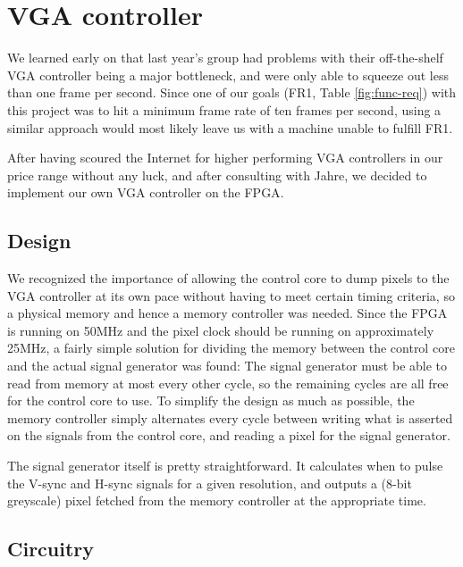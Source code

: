 \section{VGA controller}

We learned early on that last year's group had problems with their off-the-shelf
\ac{VGA} controller being a major bottleneck, and were only able to squeeze out
less than one frame per second. Since one of our goals (FR1, Table
\ref{fig:func-req}) with this project was to hit a minimum frame rate of ten
frames per second, using a similar approach would most likely leave us with a
machine unable to fulfill FR1.

After having scoured the Internet for higher performing \ac{VGA} controllers in our
price range without any luck, and after consulting with Jahre, we decided to
implement our own \ac{VGA} controller on the \ac{FPGA}.



\subsection{Design}
We recognized the importance of allowing the control core to dump pixels to the
\ac{VGA} controller at its own pace without having to meet certain timing criteria,
so a physical memory and hence a memory controller was needed. Since the \ac{FPGA}
is running on 50MHz  and the pixel clock should be running on approximately
25MHz, a fairly simple solution for dividing the memory between the control
core and the actual signal generator was found: The signal generator must be
able to read from memory at most every other cycle, so the remaining cycles are
all free for the control core to use. To simplify the design as much as
possible, the memory controller simply alternates every cycle between writing
what is asserted on the signals from the control core, and reading a pixel
for the signal generator.

The signal generator itself is pretty straightforward. It calculates
when to pulse the V-sync and H-sync signals for a given resolution, and outputs
a (8-bit greyscale) pixel fetched from the memory controller at the appropriate
time.

\subsection{Circuitry}
 

